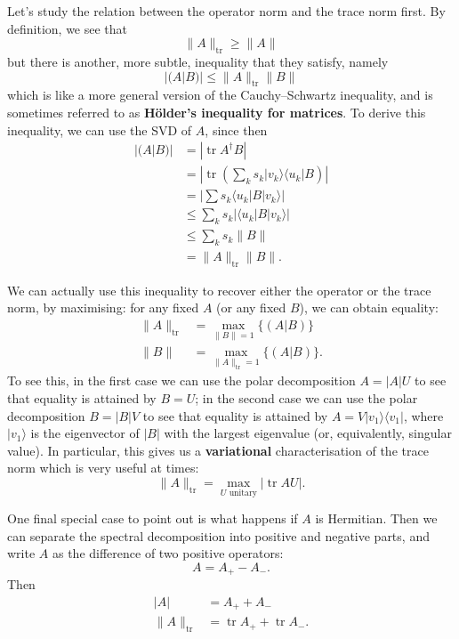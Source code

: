 \documentclass[fleqn,a4paper]{article}
\theoremstyle{definition}
\theoremstyle{definition}
\theoremstyle{definition}
\theoremstyle{definition}
\theoremstyle{remark}
\begin{document}
Let's study the relation between the operator norm and the trace norm first.
By definition, we see that
\[
  \|A\|_{\operatorname{tr}} \geqslant\|A\|
\]
but there is another, more subtle, inequality that they satisfy, namely
\[
  |(A|B)| \leqslant\|A\|_{\operatorname{tr}}\|B\|
\]
which is like a more general version of the Cauchy--Schwartz inequality, and is sometimes referred to as \textbf{Hölder's inequality for matrices}.
To derive this inequality, we can use the SVD of \(A\), since then
\[
  \begin{aligned}
    |(A|B)|
    &= |\operatorname{tr}A^\dagger B|
  \\&= \left| \operatorname{tr}\left( \sum_k s_k|v_k\rangle\langle u_k| B \right) \right|
  \\&= \left| \sum s_k\langle u_k|B|v_k\rangle \right|
  \\&\leqslant\sum_k s_k|\langle u_k|B|v_k\rangle|
  \\&\leqslant\sum_k s_k\|B\|
  \\&= \|A\|_{\operatorname{tr}}\|B\|.
  \end{aligned}
\]

We can actually use this inequality to recover either the operator or the trace norm, by maximising: for any fixed \(A\) (or any fixed \(B\)), we can obtain equality:
\[
  \begin{aligned}
    \|A\|_{\operatorname{tr}}
    &= \max_{\|B\|=1}\{(A|B)\}
  \\\|B\|
    &= \max_{\|A\|_{\operatorname{tr}}=1}\{(A|B)\}.
  \end{aligned}
\]
To see this, in the first case we can use the polar decomposition \(A=|A|U\) to see that equality is attained by \(B=U\); in the second case we can use the polar decomposition \(B=|B|V\) to see that equality is attained by \(A=V|v_1\rangle\langle v_1|\), where \(|v_1\rangle\) is the eigenvector of \(|B|\) with the largest eigenvalue (or, equivalently, singular value).
In particular, this gives us a \textbf{variational} characterisation of the trace norm which is very useful at times:
\[
  \|A\|_{\operatorname{tr}} = \max_{U\text{ unitary}}|\operatorname{tr}AU|.
\]

One final special case to point out is what happens if \(A\) is Hermitian.
Then we can separate the spectral decomposition into positive and negative parts, and write \(A\) as the difference of two positive operators:
\[
  A = A_+ - A_-.
\]
Then
\[
  \begin{aligned}
    |A|
    &= A_+ + A_-
  \\\|A\|_{\operatorname{tr}}
    &= \operatorname{tr}A_+ + \operatorname{tr}A_-.
  \end{aligned}
\]
\end{document}
